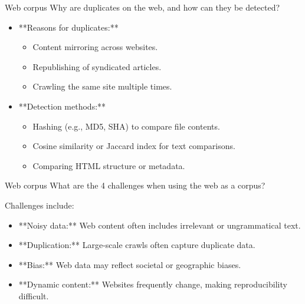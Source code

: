 \documentclass{article}
\begin{document}
\begin{exercise}{Web corpus}
  Why are duplicates on the web, and how can they be detected?

  \begin{solution}
    \begin{itemize}
        \item **Reasons for duplicates:**
        \begin{itemize}
            \item Content mirroring across websites.
            \item Republishing of syndicated articles.
            \item Crawling the same site multiple times.
        \end{itemize}
        \item **Detection methods:**
        \begin{itemize}
            \item Hashing (e.g., MD5, SHA) to compare file contents.
            \item Cosine similarity or Jaccard index for text comparisons.
            \item Comparing HTML structure or metadata.
        \end{itemize}
    \end{itemize}
  \end{solution}
\end{exercise}

\begin{exercise}{Web corpus}
  What are the 4 challenges when using the web as a corpus?

  \begin{solution}
    Challenges include:
    \begin{itemize}
        \item **Noisy data:** Web content often includes irrelevant or ungrammatical text.
        \item **Duplication:** Large-scale crawls often capture duplicate data.
        \item **Bias:** Web data may reflect societal or geographic biases.
        \item **Dynamic content:** Websites frequently change, making reproducibility difficult.
    \end{itemize}
  \end{solution}
\end{exercise}
\end{document}
